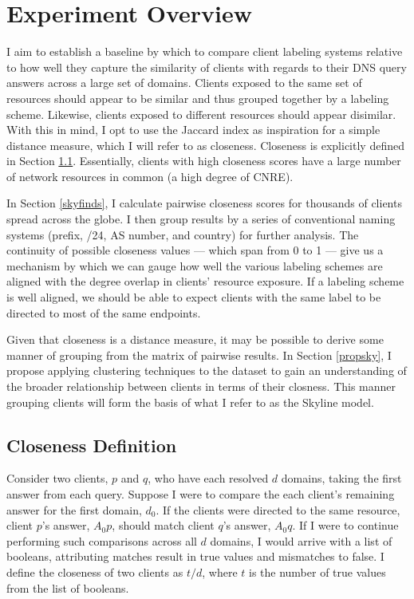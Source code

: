 \section{Experiment Overview} \label{oversky}

I aim to establish a baseline by which to compare client labeling systems relative to how well they
capture the similarity of clients with regards to their DNS query answers across a large set of
domains. Clients exposed to the same set of resources should appear to be similar and thus grouped
together by a labeling scheme. Likewise, clients exposed to different resources should appear
disimilar. With this in mind, I opt to use the Jaccard index as inspiration for a simple distance
measure, which I will refer to as closeness. Closeness is explicitly defined in Section
\ref{closeness}.
Essentially, clients with high closeness scores have a large number of network resources in common
(a high degree of CNRE). 

In Section \ref{skyfinds}, I calculate pairwise closeness scores for thousands of clients spread across the
globe. I then group results by a series of conventional naming systems (prefix, /24, AS number, and
country) for further analysis. The continuity of possible closeness values --- which span from 0 to
1 --- give us a mechanism by which we can gauge how well the various labeling schemes are aligned
with the degree overlap in clients' resource exposure. If a labeling scheme is well aligned, we
should be able to expect clients with the same label to be directed to most of the same
endpoints. 

Given that closeness is a distance measure, it may be possible to derive some manner of grouping
from the matrix of pairwise results. In Section \ref{propsky}, I propose applying clustering techniques to
the dataset to gain an understanding of the broader relationship between clients in terms of their
closness. This manner grouping clients will form the basis of what I refer to as the Skyline model.

\subsection{Closeness Definition} \label{closeness}

Consider two clients, $p$ and $q$,  who have each resolved $d$ domains, taking the first answer from
each query.  Suppose I were to compare the each client's remaining answer for the first domain,
$d_0$. If the clients were directed to the same resource, client $p$'s answer, $A_0p$, should match
client $q$'s answer, $A_0q$. If I were to continue performing such comparisons across all $d$
domains, I would arrive with a list of booleans, attributing matches result in true values and
mismatches to false.  I define the closeness of two clients as $t / d$, where $t$ is the number of
true values from the list of booleans. 

